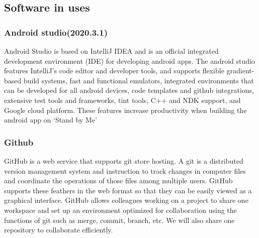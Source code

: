 \documentclass[conference]{IEEEtran}
\begin{document}
\subsection{Software in uses}
\subsubsection{Android studio(2020.3.1)}
Android Studio is based on IntelliJ IDEA and is an official integrated development environment (IDE) for developing android apps. The android studio features IntelliJ's code editor and developer tools, and supports flexible gradient-based build systems, fast and functional emulators, integrated environments that can be developed for all android devices, code templates and github integrations, extensive test tools and frameworks, tint tools, C++ and NDK support, and Google cloud platform. These features increase productivity when building the android app on ‘Stand by Me’
\vspace{1\baselineskip}
\subsubsection{Github}
GitHub is a web service that supports git store hosting. A git is a distributed version management system and instruction to track changes in computer files and coordinate the operations of those files among multiple users. GitHub supports these feathers in the web format so that they can be easily viewed as a graphical interface. GitHub allows colleagues working on a project to share one workspace and set up an environment optimized for collaboration using the functions of git such as merge, commit, branch, etc. We will also share one repository to collaborate efficiently.
\vspace{1\baselineskip}
\end{document}
